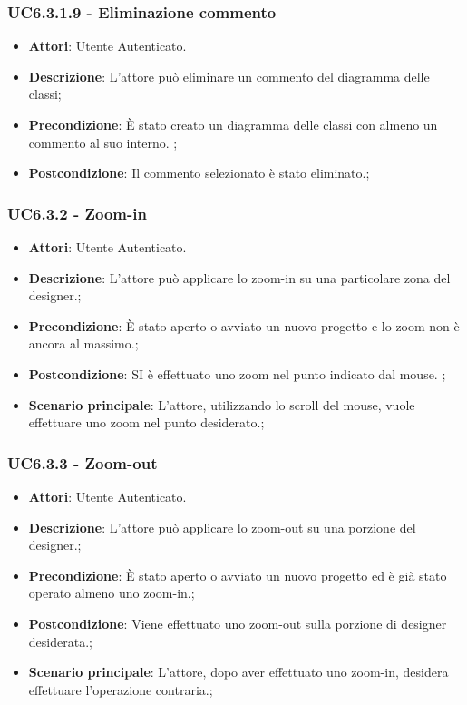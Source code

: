 \subsubsection{UC6.3.1.9 - Eliminazione commento} 
\label{sssec:UC6.3.1.9} 
\begin{itemize} 
\item \textbf{Attori}: Utente Autenticato.
\item \textbf{Descrizione}: L'attore può eliminare un commento del diagramma delle classi;
\item \textbf{Precondizione}: È stato creato un diagramma delle classi con almeno un commento al suo interno.
;
\item \textbf{Postcondizione}: Il commento selezionato è stato eliminato.;
\end{itemize} 
\subsubsection{UC6.3.2 - Zoom-in} 
\label{sssec:UC6.3.2} 
\begin{itemize} 
\item \textbf{Attori}: Utente Autenticato.
\item \textbf{Descrizione}: L'attore può applicare lo zoom-in su una particolare zona del designer.;
\item \textbf{Precondizione}: È stato aperto o avviato un nuovo progetto e lo zoom non è ancora al massimo.;
\item \textbf{Postcondizione}: SI è effettuato uno zoom nel punto indicato dal mouse.
;
\item \textbf{Scenario principale}: L'attore, utilizzando lo scroll del mouse, vuole effettuare uno zoom nel punto desiderato.;\end{itemize} 
\subsubsection{UC6.3.3 - Zoom-out} 
\label{sssec:UC6.3.3} 
\begin{itemize} 
\item \textbf{Attori}: Utente Autenticato.
\item \textbf{Descrizione}: L'attore può applicare lo zoom-out su una porzione del designer.;
\item \textbf{Precondizione}: È stato aperto o avviato un nuovo progetto ed è già stato operato almeno uno zoom-in.;
\item \textbf{Postcondizione}: Viene effettuato uno zoom-out sulla porzione di designer desiderata.;
\item \textbf{Scenario principale}: L'attore, dopo aver effettuato uno zoom-in, desidera effettuare l'operazione contraria.;\end{itemize} 
